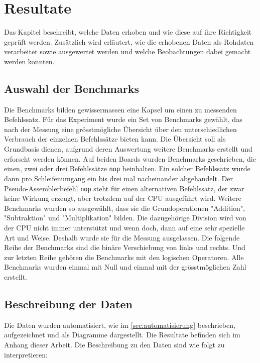 \chapter{Resultate}

Das Kapitel beschreibt, welche Daten erhoben und wie diese auf ihre Richtigkeit geprüft werden. Zusätzlich wird erläutert, wie die erhobenen Daten als Rohdaten verarbeitet sowie ausgewertet werden und welche Beobachtungen dabei gemacht werden konnten.


\section{Auswahl der Benchmarks}

Die Benchmarks bilden gewissermassen eine Kapsel um einen zu messenden Befehlssatz. Für das Experiment wurde ein Set von Benchmarks gewählt, das nach der Messung eine grösstmögliche Übersicht über den unterschiedlichen Verbrauch der einzelnen Befehlssätze bieten kann. Die Übersicht soll als Grundbasis dienen, aufgrund deren Auswertung weitere Benchmarks erstellt und erforscht werden können. Auf beiden Boards wurden Benchmarks geschrieben, die einen, zwei oder drei Befehlssätze \texttt{nop} beinhalten. Ein solcher Befehlssatz wurde dann pro Schleifenumgang ein bis drei mal nacheinander abgehandelt. Der Pseudo-Assemblerbefehl \texttt{nop} steht für einen alternativen Befehlssatz, der zwar keine Wirkung erzeugt, aber trotzdem auf der CPU ausgeführt wird. Weitere Benchmarks wurden so ausgewählt, dass sie die Grundoperationen "Addition", "Subtraktion" und "Multiplikation" bilden. Die dazugehörige Division wird von der CPU nicht immer unterstützt und wenn doch, dann auf eine sehr spezielle Art und Weise. Deshalb wurde sie für die Messung ausgelassen. Die folgende Reihe der Benchmarks sind die binäre Verschiebung von links und rechts. Und zur letzten Reihe gehören die Benchmarks mit den logischen Operatoren. Alle Benchmarks wurden einmal mit Null und einmal mit der grösstmöglichen Zahl erstellt.




\section{Beschreibung der Daten}

Die Daten wurden automatisiert, wie im \autoref{sec:automatisierung} beschrieben, aufgezeichnet und als Diagramme dargestellt. Die Resultate befinden sich im Anhang dieser Arbeit. Die Beschreibung zu den Daten sind wie folgt zu interpretieren:

